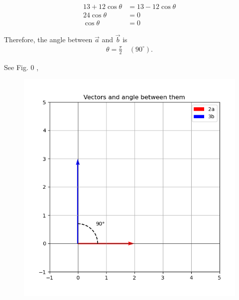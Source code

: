 \documentclass[journal]{IEEEtran}
\begin{document}
\begin{align}
13 + 12\cos\theta &= 13 - 12\cos\theta \\
24\cos\theta &= 0 \\
\cos\theta &= 0
\end{align}

Therefore, the angle between $\vec{a}$ and $\vec{b}$ is  
\begin{align*}
\theta = \frac{\pi}{2} \quad (90^\circ).
\end{align*}

See Fig. 0 ,
\begin{figure}[H]
\begin{center}
\includegraphics[width=0.6\columnwidth]{figs/fig.png}
\end{center}
\caption{}
\label{fig:Fig1}
\end{figure}
\end{document}
